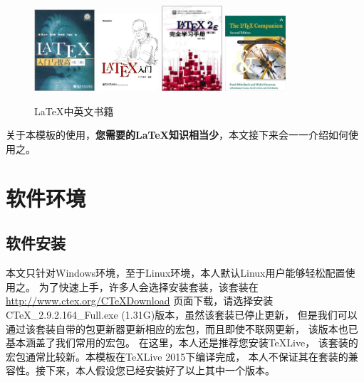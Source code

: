 \begin{figure}[h]
  \centering
  \includegraphics[width=0.2\textwidth]{pic/book/ChenZhiJie.jpg} \quad
  \includegraphics[width=0.2\textwidth]{pic/book/LiuHaiYang.jpg} \quad
  \includegraphics[width=0.2\textwidth]{pic/book/HuWei.jpg}   \quad
  \includegraphics[width=0.2\textwidth]{pic/book/LaTeXCompanion.jpg}
  \caption{\LaTeX 中英文书籍}
\end{figure}

关于本模板的使用，\textbf{您需要的\LaTeX 知识相当少}，本文接下来会一一介绍如何使用之。%


\section{软件环境}
\subsection{软件安装}
本文只针对Windows环境，至于Linux环境，本人默认Linux用户能够轻松配置使用之。%
为了快速上手，许多人会选择安装\CTeX 套装，该套装在%
\url{http://www.ctex.org/CTeXDownload} 页面下载，请选择安装%
CTeX\_2.9.2.164\_Full.exe (1.31G)版本，虽然该套装已停止更新，%
但是我们可以通过该套装自带的包更新器更新相应的宏包，而且即使不联网更新，%
该版本也已基本涵盖了我们常用的宏包。%
在这里，本人还是推荐您安装TeXLive，%
该套装的宏包通常比较新。本模板在TeXLive 2015下编译完成，%
本人不保证其在\CTeX 套装的兼容性。接下来，本人假设您已经安装好了以上其中一个版本。%


